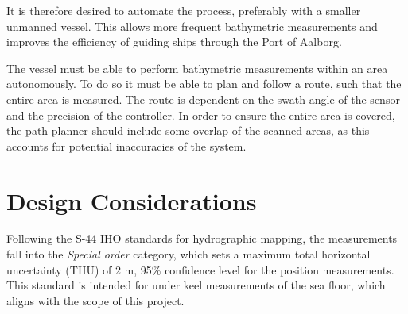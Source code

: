 It is therefore desired to automate the process, preferably with a smaller unmanned vessel. This allows more frequent bathymetric measurements and improves the efficiency of guiding ships through the Port of Aalborg.

The vessel must be able to perform bathymetric measurements within an area autonomously. 
To do so it must be able to plan and follow a route, such that the entire area is measured. 
The route is dependent on the swath angle of the sensor and the precision of the controller. In order to ensure the entire area is covered, the path planner should include some overlap of the scanned areas, as this accounts for potential inaccuracies of the system.








\section{Design Considerations}\label{sec:designconsiderations}
Following the S-44 IHO standards for hydrographic mapping, the measurements fall into the \emph{Special order} category, which sets a maximum total horizontal uncertainty (THU) of 2 m, 95\% confidence level for the position measurements. 
This standard is intended for under keel measurements of the sea floor, which aligns with the scope of this project. \cite{IHO-S-44}

